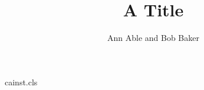 \begin{filecontents*}[overwrite]{cainst.cls}
\def\inst#1{\unskip$^{#1}$}
\def\institute#1{\gdef\@institute{\it #1}}
\def\institutename{\par\begingroup\parindent=0pt\setcounter{@inst}{1}%
  \def\and{\par\stepcounter{@inst}\noindent$^{\the@inst}$\enspace\ignorespaces}%
  \noindent$^{1}$\enspace\ignorespaces\@institute\par\endgroup}
\def\@maketitle{\begin{center}{\LARGE\@title\par}\vskip1em{\large\@author\par}\end{center}
  {\small\institutename}\vskip1em}
\end{filecontents*}
\documentclass{cainst}

\title{A Title}
\author{Ann Able and Bob Baker}
\maketitle
Text.

